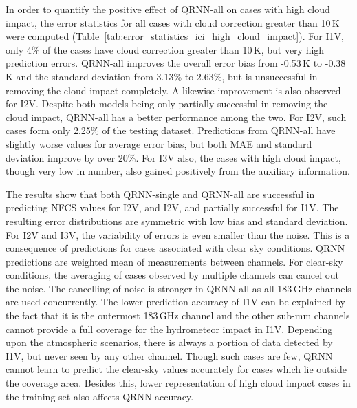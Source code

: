 \documentclass[amt, manuscript]{copernicus}
\begin{document}
In order to quantify the positive effect of QRNN-all on cases with high cloud impact, the error statistics for all cases with cloud correction greater than 10\,K were computed (Table~\ref{tab:error_statistics_ici_high_cloud_impact}). For I1V, only 4\% of the cases have cloud correction greater than 10\,K, but very high prediction errors. QRNN-all improves the overall error bias from -0.53\,K to -0.38\,K and the standard deviation from 3.13\% to 2.63\%, but is unsuccessful in removing the cloud impact completely. A likewise improvement is also observed for I2V. Despite both models being only partially successful in removing the cloud impact, QRNN-all has a better performance among the two. For I2V, such cases form only 2.25\% of the testing dataset. Predictions from QRNN-all have slightly worse values for average error bias, but both MAE and standard deviation improve by over 20\%. For I3V also, the cases with high cloud impact, though very low in number, also gained positively from the auxiliary information. 


The results show that both QRNN-single and QRNN-all are successful in predicting NFCS values for I2V, and I2V, and partially successful for I1V. The resulting error distributions are symmetric with low bias and standard deviation. For I2V and I3V, the variability of errors is even smaller than the noise. This is a consequence of predictions for cases associated with clear sky conditions. QRNN predictions are weighted mean of measurements between channels. For clear-sky conditions, the averaging of cases observed by multiple channels can cancel out the noise. The cancelling of noise is stronger in QRNN-all as all 183\,GHz channels are used concurrently. The lower prediction accuracy of I1V can be explained by the fact that it is the outermost 183\,GHz channel and the other sub-mm channels cannot provide a full coverage for the hydrometeor impact in I1V. Depending upon the atmospheric scenarios, there is always a portion of data detected by I1V, but never seen by any other channel. Though such cases are few, QRNN cannot learn to predict the clear-sky values accurately for cases which lie outside the coverage area. Besides this, lower representation of high cloud impact cases in the training set also affects QRNN accuracy.
 
\end{document}
